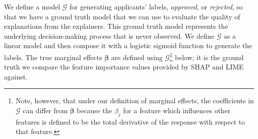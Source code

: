\documentclass[12pt]{article}  %
\begin{document}
\begin{table}[ht]
\centering
{}
\caption{Description of features for simulated loan data.}
\label{tab:simulated}
\end{table}



   We define a model $\mathcal{G}$ for generating applicants' labels, \textit{approved}, or \textit{rejected}, so that we have a ground truth model that we can use to evaluate the quality of explanations from the explainers. This ground truth model represents the underlying decision-making process that is never observed.  We define $\mathcal{G}$ as a linear model and then compose it with a logistic sigmoid function to generate the labels. The true marginal effects $\boldsymbol{\beta}$ are defined using $\mathcal{G}$\footnote{Note, however, that under our definition of marginal effects, the coefficients in $\mathcal{G}$ can differ from $\boldsymbol{\beta}$ because the $\beta_j$ for a feature which influences other features is defined to be the total derivative of the response with respect to that feature.} below; it is the ground truth we compare the feature importance values provided by SHAP and LIME against.
   
\end{document}
